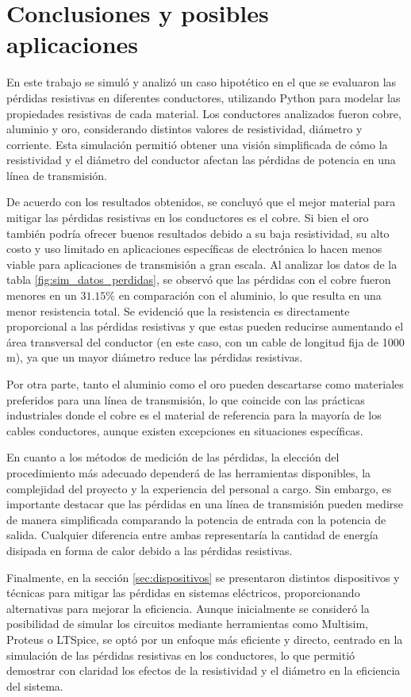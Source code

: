 \section{Conclusiones y posibles aplicaciones}


   En este trabajo se simuló y analizó un caso hipotético en el que se evaluaron las pérdidas resistivas en diferentes conductores, utilizando Python para modelar las propiedades resistivas de cada material. Los conductores analizados fueron cobre, aluminio y oro, considerando distintos valores de resistividad, diámetro y corriente. Esta simulación permitió obtener una visión simplificada de cómo la resistividad y el diámetro del conductor afectan las pérdidas de potencia en una línea de transmisión.

    De acuerdo con los resultados obtenidos, se concluyó que el mejor material para mitigar las pérdidas resistivas en los conductores es el cobre. Si bien el oro también podría ofrecer buenos resultados debido a su baja resistividad, su alto costo y uso limitado en aplicaciones específicas de electrónica lo hacen menos viable para aplicaciones de transmisión a gran escala. Al analizar los datos de la tabla \ref{fig:sim_datos_perdidas}, se observó que las pérdidas con el cobre fueron menores en un $31.15 \%$ en comparación con el aluminio, lo que resulta en una menor resistencia total. Se evidenció que la resistencia es directamente proporcional a las pérdidas resistivas y que estas pueden reducirse aumentando el área transversal del conductor (en este caso, con un cable de longitud fija de 1000 m), ya que un mayor diámetro reduce las pérdidas resistivas.
    
    Por otra parte, tanto el aluminio como el oro pueden descartarse como materiales preferidos para una línea de transmisión, lo que coincide con las prácticas industriales donde el cobre es el material de referencia para la mayoría de los cables conductores, aunque existen excepciones en situaciones específicas.
    
    En cuanto a los métodos de medición de las pérdidas, la elección del procedimiento más adecuado dependerá de las herramientas disponibles, la complejidad del proyecto y la experiencia del personal a cargo. Sin embargo, es importante destacar que las pérdidas en una línea de transmisión pueden medirse de manera simplificada comparando la potencia de entrada con la potencia de salida. Cualquier diferencia entre ambas representaría la cantidad de energía disipada en forma de calor debido a las pérdidas resistivas.
    
    Finalmente, en la sección \ref{sec:dispositivos} se presentaron distintos dispositivos y técnicas para mitigar las pérdidas en sistemas eléctricos, proporcionando alternativas para mejorar la eficiencia. Aunque inicialmente se consideró la posibilidad de simular los circuitos mediante herramientas como Multisim, Proteus o LTSpice, se optó por un enfoque más eficiente y directo, centrado en la simulación de las pérdidas resistivas en los conductores, lo que permitió demostrar con claridad los efectos de la resistividad y el diámetro en la eficiencia del sistema.


\newpage
